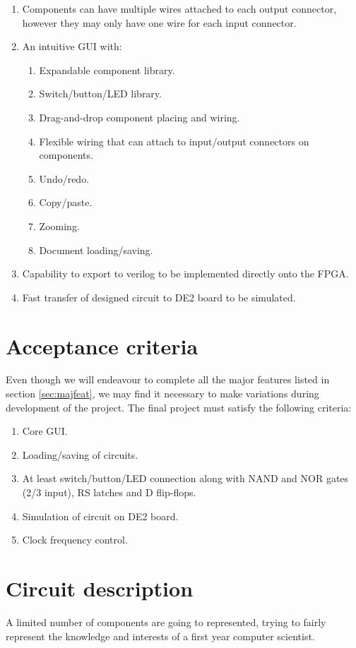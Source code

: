 \documentclass[12pt, a4paper, oneside,titlepage]{article}
\begin{document}
\begin{enumerate}
\item Components can have multiple wires attached to each output connector, however they may only have one wire for each input connector.  
\item An intuitive GUI with:  \begin{enumerate}
						\item Expandable component library.
						\item Switch/button/LED library. 
						\item Drag-and-drop component placing and wiring.
					    \item Flexible wiring that can attach to input/output connectors on components.
					    \item Undo/redo.
					     \item Copy/paste.
					    	\item Zooming.
						\item Document loading/saving.
						\end{enumerate}
\item Capability to export to verilog to be implemented directly onto the FPGA.
\item Fast transfer of designed circuit to DE2 board to be simulated.
\end{enumerate}

\section{Acceptance criteria}
Even though we will endeavour to complete all the major features listed in section \ref{sec:majfeat}, we may find it necessary to make variations during development of the project. The final project must satisfy the following criteria:
\begin{enumerate}
\item Core GUI.
\item Loading/saving of circuits.
\item At least switch/button/LED connection along with NAND and NOR gates (2/3 input), RS latches and D flip-flops.
\item Simulation of circuit on DE2 board.
\item Clock frequency control.
\end{enumerate}

\section{Circuit description}
A limited number of components are going to represented, trying to fairly represent the knowledge and interests of a first year computer scientist. 
\end{document}
